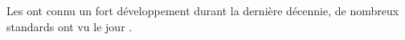 \documentclass[../main.tex]{subfiles}
\begin{document}
\begin{frame}{}
  \begin{overlayarea}{\linewidth}{.2\textheight}
  Les  ont connu un fort développement durant la dernière décennie, de nombreux standards ont vu le jour \footnotemark.
  \end{overlayarea}

  \begin{overlayarea}{\linewidth}{.6\textheight}
\end{overlayarea}
\end{frame}
\end{document}
